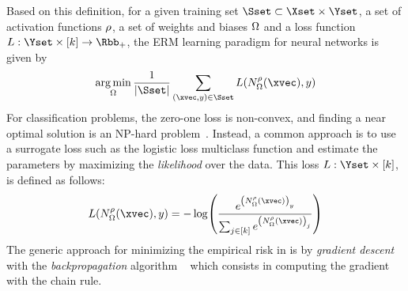 \noindent
Based on this definition, for a given training set $\Sset \subset \Xset \times \Yset$, a set of activation functions $\rho$, a set of weights and biases $\Omega$ and a loss function $L: \Yset \times [k] \rightarrow \Rbb_+$, the ERM learning paradigm for neural networks is given by
\begin{equation} \label{equation:ch2-erm_neural_network}
  \argmin_{\weights} \frac{1}{|\Sset|} \sum_{(\xvec, y) \in \Sset} L(N^\act_\weights(\xvec), y) 
\end{equation}
For classification problems, the zero-one loss is non-convex, and finding a near optimal solution is an NP-hard problem~\cite{feldman2012agnostic,bendavid2003difficulty}.
Instead, a common approach is to use a surrogate loss such as the logistic loss multiclass function and estimate the parameters by maximizing the \emph{likelihood} over the data.
This loss $L:\Yset \times [k]$, is defined as follows:
\begin{equation}
  L(N^\rho_\Omega(\xvec), y) = -\log
    \left(
      \frac
        {e^{\left(N^\rho_\Omega(\xvec)\right)_y}}
	{\sum_{j\in[k]} e^{\left(N^\rho_\Omega(\xvec)\right)_j}}
    \right)
\end{equation}
The generic approach for minimizing the empirical risk in  is by \emph{gradient descent} with the \emph{backpropagation} algorithm ~\cite{rumelhart1986learning} which consists in computing the gradient with the chain rule.






